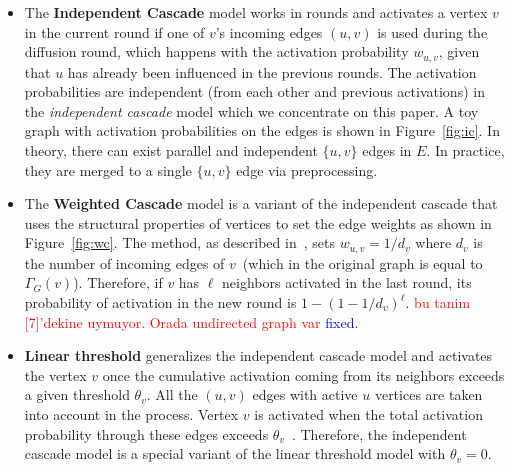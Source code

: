 \documentclass[10pt,journal,compsoc]{IEEEtran}
\newcommand\ggx[1]{\textcolor{blue}{#1}}
\newcommand\kktodo[1]{\textcolor{red}{#1}}
\begin{document}
\begin{itemize}[leftmargin=*]
\item The {\bf Independent Cascade} model works in rounds and activates a vertex $v$ in the current round if one of $v$'s incoming edges $(u, v)$ is 
used during the diffusion round, which happens with the activation probability $w_{u, v}$, given that $u$ has already been influenced in the previous rounds. The activation probabilities are independent (from each other and previous activations) in the {\em independent cascade} model which we concentrate on this paper. A toy graph with activation probabilities on the edges is shown in Figure~\ref{fig:ic}.
In theory, there can exist parallel and independent $\{u, v\}$ edges in $E$. In practice, they are merged to a single $\{u,v\}$ edge via preprocessing. 

\item The {\bf Weighted Cascade}  model is a variant of the independent cascade that uses the structural properties of vertices to set the edge weights as shown in Figure~\ref{fig:wc}.
The method, as described in~\cite{kempe2003maximizing}, sets $w_{u, v} = 1 / d_v$ where $d_v$ is the number 
of incoming edges of $v$~(which in the original graph is equal to $\Gamma _G(v)$).
Therefore, if $v$ has $\ell$ neighbors activated in the last round, its probability of activation in the new round is $1-( 1-1 / d_v)^\ell$. 
\kktodo{bu tanim [7]'dekine uymuyor. Orada undirected graph var }\ggx{fixed.} 


\item{\bf Linear threshold} generalizes the independent cascade model and activates the vertex $v$ once the cumulative activation coming from its neighbors exceeds a given threshold $\theta_v$. 
All the $(u, v)$ edges with active $u$ vertices are taken into account in the process. Vertex $v$ is activated when the total activation probability through these edges exceeds $\theta_v$~\cite{kempe2003maximizing}.  
Therefore, the independent cascade model is a special variant of the linear threshold model with $\theta_v = 0$. 
\end{itemize}
\end{document}
